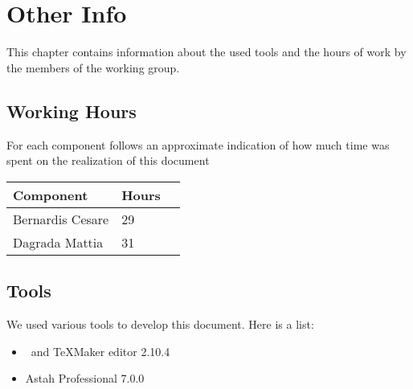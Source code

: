 \section{Other Info}
	This chapter contains information about the used tools and the hours of
	work by the members of the working group.
	\subsection{Working Hours}
	For each component follows an approximate indication of how much time was
	spent on the realization of this document
	\begin{center}
		\begin{tabular}{ | l | l | p{5cm} |}
			\hline
			Component & Hours 					\\ \hline
			Bernardis Cesare & 29 				\\ \hline
			Dagrada Mattia & 31  				\\ \hline
		\end{tabular}
	\end{center}
	\subsection{Tools}
	We used various tools to develop this document. Here is a list:
	\begin{itemize}
		\item \LaTeXe \, and TeXMaker editor 2.10.4
		\item Astah Professional 7.0.0
	\end{itemize}
